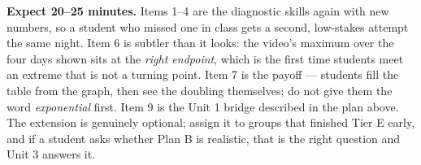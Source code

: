 \documentclass[10pt]{article}
\begin{document}
\boxguard[18]
\begin{teachernote}[Homework]
    \textbf{Expect 20--25 minutes.} Items 1--4 are the diagnostic skills again with new numbers,
    so a student who missed one in class gets a second, low-stakes attempt the same night. Item 6
    is subtler than it looks: the video's maximum over the four days shown sits at the
    \emph{right endpoint}, which is the first time students meet an extreme that is not a turning
    point. Item 7 is the payoff --- students fill the table from the graph, then see the doubling
    themselves; do not give them the word \emph{exponential} first. Item 9 is the Unit 1 bridge
    described in the plan above. The extension is genuinely optional; assign it to groups that
    finished Tier E early, and if a student asks whether Plan B is realistic, that is the right
    question and Unit 3 answers it.
\end{teachernote}
\end{document}
